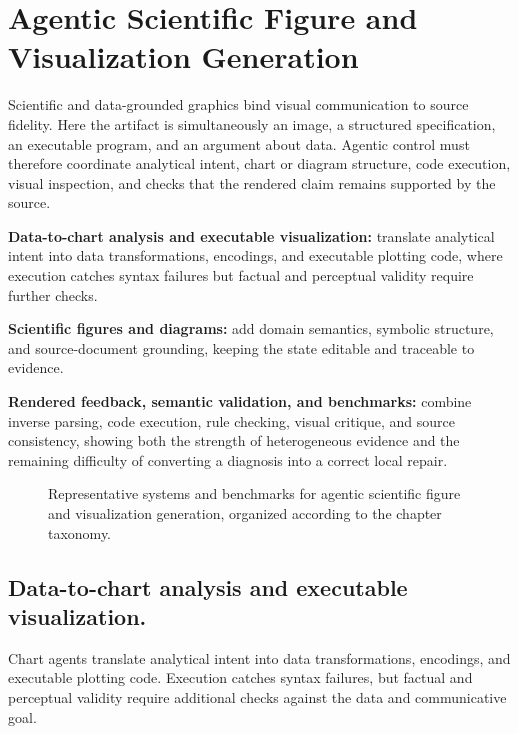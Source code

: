 \section{Agentic Scientific Figure and Visualization Generation}
\label{sec:scientific-visualization}

Scientific and data-grounded graphics bind visual communication to source fidelity. Here the artifact is simultaneously an image, a structured specification, an executable program, and an argument about data. Agentic control must therefore coordinate analytical intent, chart or diagram structure, code execution, visual inspection, and checks that the rendered claim remains supported by the source.

\begin{keytakeaway}
\begin{keypoints}
  \item \textbf{Data-to-chart analysis and executable visualization:} translate analytical intent into data transformations, encodings, and executable plotting code, where execution catches syntax failures but factual and perceptual validity require further checks.

  \item \textbf{Scientific figures and diagrams:} add domain semantics, symbolic structure, and source-document grounding, keeping the state editable and traceable to evidence.

  \item \textbf{Rendered feedback, semantic validation, and benchmarks:} combine inverse parsing, code execution, rule checking, visual critique, and source consistency, showing both the strength of heterogeneous evidence and the remaining difficulty of converting a diagnosis into a correct local repair.
\end{keypoints}
\end{keytakeaway}

\begin{figure}[!htbp]
  \centering
  
  \caption{Representative systems and benchmarks for agentic scientific figure and visualization generation, organized according to the chapter taxonomy.}
  \label{fig:ch7-representative-systems}
\end{figure}

\subsection{Data-to-chart analysis and executable visualization.}
Chart agents translate analytical intent into data transformations, encodings, and executable plotting code. Execution catches syntax failures, but factual and perceptual validity require additional checks against the data and communicative goal.

